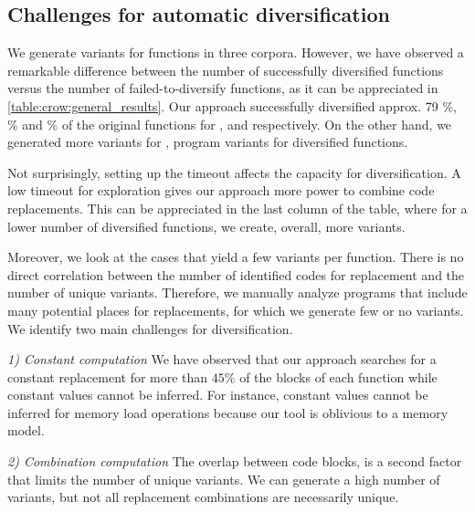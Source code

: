 

\subsection{Challenges for automatic diversification}



We generate variants for functions in three corpora. However, we have observed a remarkable difference between the number of successfully diversified functions versus the number of failed-to-diversify functions, as it can be appreciated in \autoref{table:crow:general_results}. Our approach successfully diversified approx. 79 \%, \% and \% of the original functions for \corpusrosetta, \corpussodium and \corpusqrcode respectively. On the other hand, we generated more variants for \corpusqrcode, \py{\qrpopulation} program variants for \py{\diversifiedqrcode} diversified functions. 

Not surprisingly, setting up the timeout affects the capacity for diversification. A low timeout for exploration gives our approach more power to combine code replacements. This can be appreciated in the last column of the table, where for a lower number of diversified functions, we create, overall, more variants.

Moreover, we look at the cases that yield a few variants per function. There is no direct correlation between the number of identified codes for replacement and the number of unique variants. Therefore, we manually analyze programs that include many potential places for replacements, for which we generate few or no variants. 
We identify two main challenges for diversification.

\emph{1) Constant computation}  We have observed that our approach searches for a constant replacement for more than $45\%$ of the blocks of each function while constant values cannot be inferred. For instance,  constant values cannot be inferred for memory load operations because our tool is oblivious to a memory model. 


\emph{2) Combination computation}  The overlap between code blocks, is a second factor that limits the number of unique variants. We can generate a high number of variants, but not all replacement combinations are necessarily unique.

